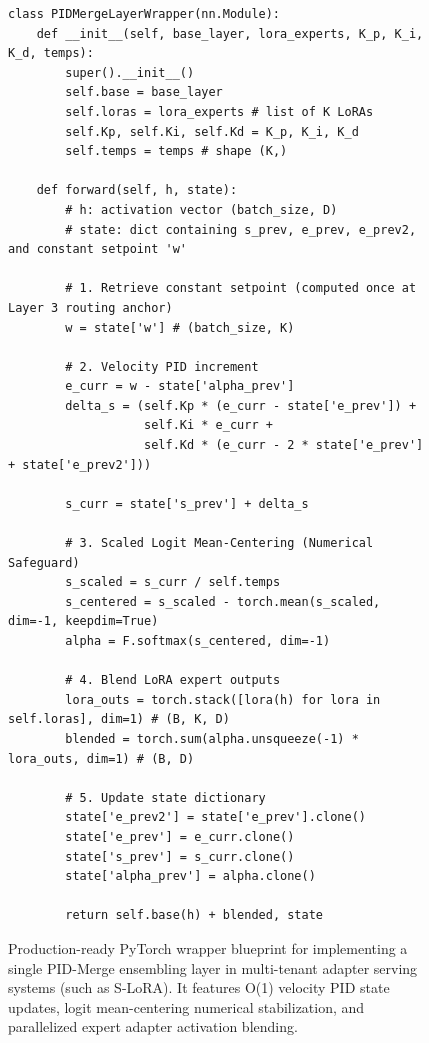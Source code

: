 \begin{figure}[htbp]
\begin{center}
\begin{minipage}{0.95\textwidth}
\begin{verbatim}
class PIDMergeLayerWrapper(nn.Module):
    def __init__(self, base_layer, lora_experts, K_p, K_i, K_d, temps):
        super().__init__()
        self.base = base_layer
        self.loras = lora_experts # list of K LoRAs
        self.Kp, self.Ki, self.Kd = K_p, K_i, K_d
        self.temps = temps # shape (K,)

    def forward(self, h, state):
        # h: activation vector (batch_size, D)
        # state: dict containing s_prev, e_prev, e_prev2, and constant setpoint 'w'
        
        # 1. Retrieve constant setpoint (computed once at Layer 3 routing anchor)
        w = state['w'] # (batch_size, K)
        
        # 2. Velocity PID increment
        e_curr = w - state['alpha_prev']
        delta_s = (self.Kp * (e_curr - state['e_prev']) + 
                   self.Ki * e_curr + 
                   self.Kd * (e_curr - 2 * state['e_prev'] + state['e_prev2']))
        
        s_curr = state['s_prev'] + delta_s
        
        # 3. Scaled Logit Mean-Centering (Numerical Safeguard)
        s_scaled = s_curr / self.temps
        s_centered = s_scaled - torch.mean(s_scaled, dim=-1, keepdim=True)
        alpha = F.softmax(s_centered, dim=-1)
        
        # 4. Blend LoRA expert outputs
        lora_outs = torch.stack([lora(h) for lora in self.loras], dim=1) # (B, K, D)
        blended = torch.sum(alpha.unsqueeze(-1) * lora_outs, dim=1) # (B, D)
        
        # 5. Update state dictionary
        state['e_prev2'] = state['e_prev'].clone()
        state['e_prev'] = e_curr.clone()
        state['s_prev'] = s_curr.clone()
        state['alpha_prev'] = alpha.clone()
        
        return self.base(h) + blended, state
\end{verbatim}
\end{minipage}
\caption{Production-ready PyTorch wrapper blueprint for implementing a single PID-Merge ensembling layer in multi-tenant adapter serving systems (such as S-LoRA). It features O(1) velocity PID state updates, logit mean-centering numerical stabilization, and parallelized expert adapter activation blending.}
\label{fig:blueprint_code_appendix}
\end{center}
\end{figure}


